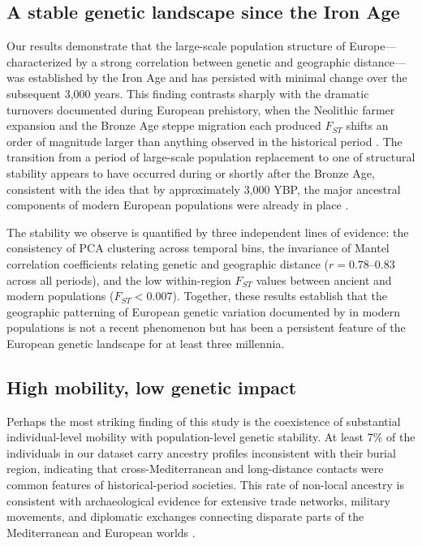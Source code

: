 \documentclass[11pt,a4paper]{article}
\begin{document}
\subsection{A stable genetic landscape since the Iron Age}
Our results demonstrate that the large-scale population structure of Europe---characterized by a strong correlation between genetic and geographic distance---was established by the Iron Age and has persisted with minimal change over the subsequent 3,000 years. This finding contrasts sharply with the dramatic turnovers documented during European prehistory, when the Neolithic farmer expansion and the Bronze Age steppe migration each produced $F_{ST}$ shifts an order of magnitude larger than anything observed in the historical period \citep{haak2015massive, allentoft2015population, mathieson2015genome}. The transition from a period of large-scale population replacement to one of structural stability appears to have occurred during or shortly after the Bronze Age, consistent with the idea that by approximately 3,000 YBP, the major ancestral components of modern European populations were already in place \citep{lazaridis2014ancient, pickrell2014toward}.

The stability we observe is quantified by three independent lines of evidence: the consistency of PCA clustering across temporal bins, the invariance of Mantel correlation coefficients relating genetic and geographic distance ($r = 0.78$--$0.83$ across all periods), and the low within-region $F_{ST}$ values between ancient and modern populations ($F_{ST} < 0.007$). Together, these results establish that the geographic patterning of European genetic variation documented by \citet{novembre2008genes} in modern populations is not a recent phenomenon but has been a persistent feature of the European genetic landscape for at least three millennia.

\subsection{High mobility, low genetic impact}
Perhaps the most striking finding of this study is the coexistence of substantial individual-level mobility with population-level genetic stability. At least 7\% of the individuals in our dataset carry ancestry profiles inconsistent with their burial region, indicating that cross-Mediterranean and long-distance contacts were common features of historical-period societies. This rate of non-local ancestry is consistent with archaeological evidence for extensive trade networks, military movements, and diplomatic exchanges connecting disparate parts of the Mediterranean and European worlds \citep{antonio2019ancient}.
\end{document}
